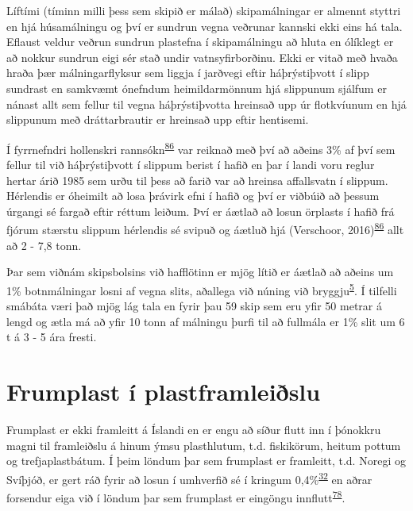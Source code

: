 \documentclass[icelandic,]{book}
\begin{document}
Líftími (tíminn milli þess sem skipið er málað) skipamálningar er almennt styttri en hjá húsamálningu og því er sundrun vegna veðrunar kannski ekki eins há tala. Eflaust veldur veðrun sundrun plastefna í skipamálningu að hluta en ólíklegt er að nokkur sundrun eigi sér stað undir vatnsyfirborðinu. Ekki er vitað með hvaða hraða þær málningarflyksur sem liggja í jarðvegi eftir háþrýstiþvott í slipp sundrast en samkvæmt ónefndum heimildarmönnum hjá slippunum sjálfum er nánast allt sem fellur til vegna háþrýstiþvotta hreinsað upp úr flotkvíunum en hjá slippunum með dráttarbrautir er hreinsað upp eftir hentisemi.

Í fyrrnefndri hollenskri rannsókn\textsuperscript{\protect\hyperlink{ref-Verschoor2016}{86}} var reiknað með því að aðeins 3\% af því sem fellur til við háþrýstiþvott í slippum berist í hafið en þar í landi voru reglur hertar árið 1985 sem urðu til þess að farið var að hreinsa affallsvatn í slippum. Hérlendis er óheimilt að losa þrávirk efni í hafið og því er viðbúið að þessum úrgangi sé fargað eftir réttum leiðum. Því er áætlað að losun örplasts í hafið frá fjórum stærstu slippum hérlendis sé svipuð og áætluð hjá (Verschoor, 2016)\textsuperscript{\protect\hyperlink{ref-Verschoor2016}{86}} allt að 2 - 7,8 tonn.

Þar sem viðnám skipsbolsins við hafflötinn er mjög lítið er áætlað að aðeins um 1\% botnmálningar losni af vegna slits, aðallega við núning við bryggju\textsuperscript{\protect\hyperlink{ref-OECD2009}{5}}. Í tilfelli smábáta væri það mjög lág tala en fyrir þau 59 skip sem eru yfir 50 metrar á lengd og ætla má að yfir 10 tonn af málningu þurfi til að fullmála er 1\% slit um 6 t á 3 - 5 ára fresti. 


\hypertarget{frumplast-i-plastframleislu}{%
\section*{Frumplast í plastframleiðslu}\label{frumplast-i-plastframleislu}}

Frumplast er ekki framleitt á Íslandi en er engu að síður flutt inn í þónokkru magni til framleiðslu á hinum ýmsu plasthlutum, t.d. fiskikörum, heitum pottum og trefjaplastbátum. Í þeim löndum þar sem frumplast er framleitt, t.d. Noregi og Svíþjóð, er gert ráð fyrir að losun í umhverfið sé í kringum 0,4\%\textsuperscript{\protect\hyperlink{ref-sundt2014sources}{32}} en aðrar forsendur eiga við í löndum þar sem frumplast er eingöngu innflutt\textsuperscript{\protect\hyperlink{ref-lassen2015microplastics}{78}}.
\end{document}
